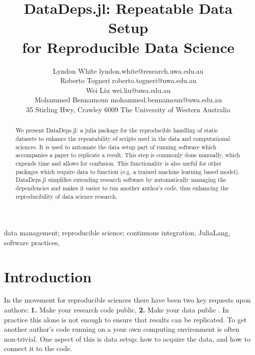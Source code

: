 \documentclass[twoside,11pt]{article}
\begin{document}
\title{DataDeps.jl: Repeatable Data Setup \\ for Reproducible Data Science}
\author{%
	\name Lyndon White \email lyndon.white@research.uwa.edu.au\\
	\name Roberto Togneri \email roberto.togneri@uwa.edu.au\\
	\name Wei Liu \email wei.liu@uwa.edu.au\\
	\name Mohammed Bennamoun \email mohammed.bennamoun@uwa.edu.au\\
	35 Stirling Hwy, Crawley 6009 \hfill The University of Western Australia 
}
\editor{}


\maketitle

\begin{abstract}
	We present DataDeps.jl: a julia package for the reproducible handling of static datasets to enhance the repeatability of scripts used in the data and computational sciences.
	It is used to automate the data setup part of running software which accompanies a paper to replicate a result.
	This step is commonly done manually, which expends time and allows for confusion.
	This functionality is also useful for other packages which require data to function (e.g. a trained machine learning based model).
	DataDeps.jl simplifies extending research software by automatically managing the dependencies and makes it easier to run another author's code, thus enhancing the reproducibility of data science research.
\end{abstract}

\begin{keywords}
data management;  reproducible science; continuous integration, JuliaLang, software practices, %
\end{keywords}

\section{Introduction}

In the movement for reproducible sciences there have been two key requests upon authors:
\textbf{1.} Make your research code public, \textbf{2.} Make your data public \citep{lookafterdata}.
In practice this alone is not enough to ensure that results can be replicated.
To get another author's code running on a your own computing environment is often non-trivial.
One aspect of this is data setup: how to acquire the data, and how to connect it to the code.
\end{document}
